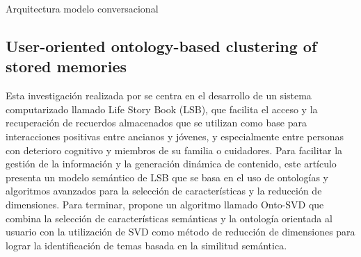 %
{Arquitectura modelo conversacional \citep{deconversational}}

\subsection{User-oriented ontology-based clustering of stored memories}
Esta investigación realizada por \cite{shi2012user} se centra en el desarrollo de un sistema computarizado llamado Life Story Book (LSB), que facilita el acceso y la recuperación de recuerdos almacenados que se utilizan como base para interacciones positivas entre ancianos y jóvenes, y especialmente entre personas con deterioro cognitivo y miembros de su familia o cuidadores. Para facilitar la gestión de la información y la generación dinámica de contenido, este artículo presenta un modelo semántico de LSB que se basa en el uso de ontologías y algoritmos avanzados para la selección de características y la reducción de dimensiones. Para terminar, propone un algoritmo llamado Onto-SVD que combina la selección de características semánticas y la ontología orientada al usuario con  la utilización de SVD como método de reducción de dimensiones para lograr la identificación de temas basada en la similitud semántica.

